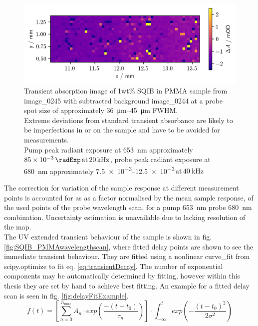 \documentclass[twoside,openright]{scrreprt}
\def\pumpExp#1{\ensuremath{\SI{#1}{\radExp}\,\mathrm{at}\, \SI{20}{\kilo\hertz}}}
\def\frep#1{\ensuremath{\,\mathrm{at}\, \SI{#1}{\kilo\hertz}}}
\begin{document}
{\begin{figure}[hbt]
\centering
\includegraphics[scale=1]{images/1percentSQIBinPMMA_Sample653-680Image.png}
\caption{Transient absorption image of 1wt\% SQIB in PMMA sample from image\_0245 with subtracted background image\_0244 at a probe spot size of approximately \SIrange{36}{45}{\micro\meter} FWHM.\\ Extreme deviations from standard transient absorbance are likely to be imperfections in or on the sample and have to be avoided for measurements.\\ Pump peak radiant exposure at \SI{653}{\nano\meter} approximately \pumpExp{85e-3}, probe peak radiant exposure at \SI{680}{\nano\meter} approximately \SIrange{7.5e-3}{12.5e-3}{\radExp}\frep{40} \label{fig:TA_image_sample}}
\end{figure}

The correction for variation of the sample response at different measurement points is accounted for as as a factor normalised by the mean sample response, of the used points of the probe wavelength scan, for a pump \SI{653}{\nano\meter} probe \SI{680}{\nano\meter} combination. Uncertainty estimation is unavailable due to lacking resolution of the map.\\
The UV extended transient behaviour of the sample is shown in fig. \ref{fig:SQIB_PMMAwavelengthscan}, where fitted delay points are shown to see the immediate transient behaviour. They are fitted using a nonlinear curve\_fit from scipy.optimize to fit eq. \ref{eq:transientDecay}. The number of exponential components may be automatically determined by fitting, however within this thesis they are set by hand to achieve best fitting. An example for a fitted delay scan is seen in fig. \ref{fig:delayFitExample}.
\begin{equation}\label{eq:transientDecay}
f(t) = \left[\sum_{n=0}^{n_{max}} A_n\cdot exp \left(\frac{-(t-t_0)}{\tau_n}\right)\right]\cdot \int_{-\infty}^t exp\left(-\frac{(t-t_0)^2}{2\sigma^2}\right)
\end{equation}

}
\end{document}

